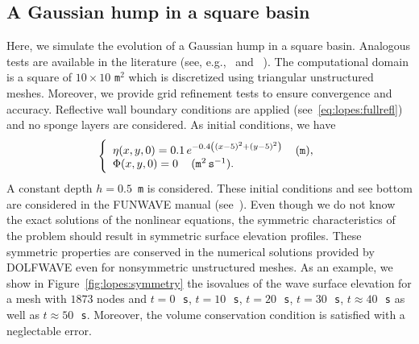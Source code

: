 \subsection{A Gaussian hump in a square basin}
Here, we simulate the evolution of a Gaussian hump in a square
basin. Analogous tests are available in the literature (see,
e.g.,~\citet{WeiKirby1995} and ~\citet{WooLiu2004a}).  The
computational domain is a square of \(10\times 10\) {\tt m}\(^2\)
which is discretized using triangular unstructured meshes.  Moreover,
we provide grid refinement tests to ensure convergence and accuracy.
Reflective wall boundary conditions are applied
(see~\eqref{eq:lopes:fullrefl}) and no sponge layers are considered.
As initial conditions, we have
\begin{equation}
  \left\{
    \begin{array}{l}
      \eta(x,y,0)=0.1\,e^{-0.4\left((x-5)^2+(y-5)^2\right)}\, \quad
      {(\tt m)},\\
      \Phi(x,y,0)=0\,\quad ({\tt m}^2\,{\tt s}^{-1}).
    \end{array}
  \right.
\end{equation}
A constant depth \(h=0.5\)~{\tt m} is considered.  These initial
conditions and see bottom are considered in the FUNWAVE manual
(see~\citet{Kirby1998}).  Even though we do not know the exact
solutions of the nonlinear equations, the symmetric characteristics of
the problem should result in symmetric surface elevation profiles.
These symmetric properties are conserved in the numerical solutions
provided by DOLFWAVE even for nonsymmetric unstructured meshes.  As an
example, we show in Figure~\ref{fig:lopes:symmetry} the isovalues of
the wave surface elevation for a mesh with $1873$ nodes and
$t=0$\,~{\tt s}, $t=10$\,~{\tt s}, $t=20$\,~{\tt s}, $t=30$\,~{\tt s},
$t\approx 40$\,~{\tt s} as well as $t\approx 50$\,~{\tt s}.  Moreover,
the volume conservation condition is satisfied with a neglectable
error.

